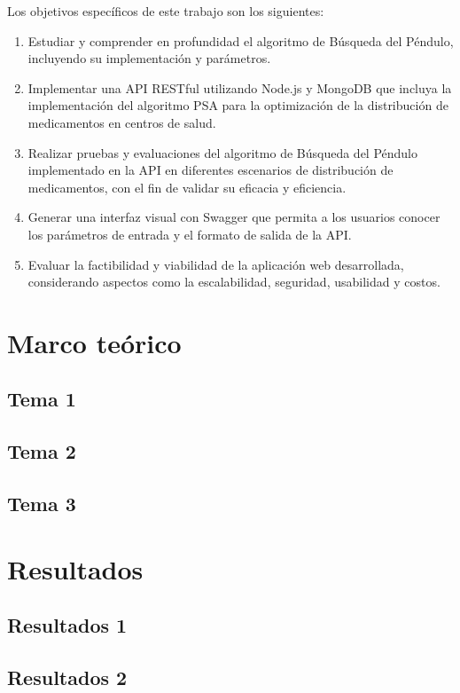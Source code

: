 \documentclass[conference]{IEEEtran}
\begin{document}
Los objetivos específicos de este trabajo son los siguientes:
\begin{enumerate}
    \item Estudiar y comprender en profundidad el algoritmo de Búsqueda del Péndulo, incluyendo su implementación y parámetros.
    \item Implementar una API RESTful utilizando Node.js y MongoDB que incluya la implementación del algoritmo PSA para la optimización de la distribución de medicamentos en centros de salud.
    \item Realizar pruebas y evaluaciones del algoritmo de Búsqueda del Péndulo implementado en la API en diferentes escenarios de distribución de medicamentos, con el fin de validar su eficacia y eficiencia.
    \item Generar una interfaz visual con Swagger que permita a los usuarios conocer los parámetros de entrada y el formato de salida de la API.
    \item Evaluar la factibilidad y viabilidad de la aplicación web desarrollada, considerando aspectos como la escalabilidad, seguridad, usabilidad y costos.
\end{enumerate}
\section{Marco teórico}
\label{sec:MT}
\subsection{Tema 1}

\subsection{Tema 2}

\subsection{Tema 3}

\section{Resultados}
\label{sec:Res}
\subsection{Resultados 1}

\subsection{Resultados 2}
\end{document}
